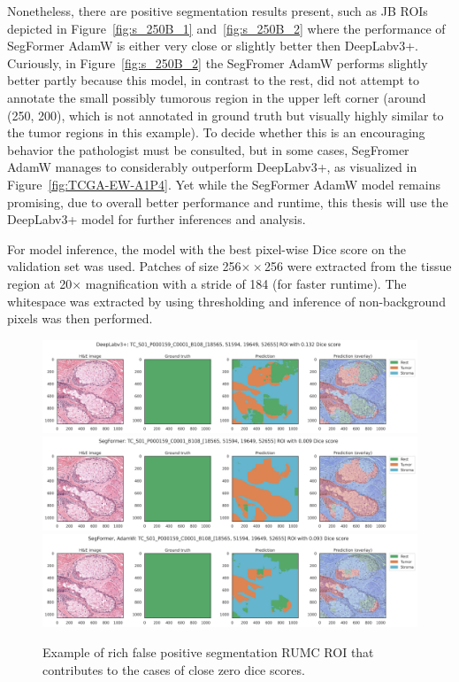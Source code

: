Nonetheless, there are positive segmentation results present, such as JB ROIs depicted in
Figure~\ref*{fig:s_250B_1} and~\ref*{fig:s_250B_2} where the performance of SegFormer AdamW
is either very close or slightly better then DeepLabv3+. 
Curiously, in Figure~\ref*{fig:s_250B_2} the SegFromer AdamW performs slightly better partly
because this model, in contrast to the rest, did not attempt to annotate the small possibly
tumorous region in the upper left corner (around (250, 200), which is not annotated in ground
truth but visually highly similar to the tumor regions in this example). To decide whether
this is an encouraging behavior the pathologist must be consulted, but in some cases,
SegFromer AdamW manages to considerably outperform DeepLabv3+, as visualized in
Figure~\ref*{fig:TCGA-EW-A1P4}. Yet while the SegFormer AdamW model remains promising, due to overall better performance and
runtime, this thesis will use the DeepLabv3+ model for further inferences and analysis.

For model inference, the model with the best pixel-wise Dice score on the validation set was used.
Patches of size 256$×\times$256 were extracted from the tissue region at 20$\times$ magnification
with a stride of 184 (for faster runtime). The whitespace was extracted by using thresholding and
inference of non-background pixels was then performed.

\begin{figure}[H]
    \includegraphics[width=\linewidth]{figures/tissue/deeplabv3+_dice_tc_TC_S01_P000159_C0001_B108_[18565,_51594,_19649,_52655]_check.png}
    \includegraphics[width=\linewidth]{figures/tissue/segformer_dice_tc_TC_S01_P000159_C0001_B108_[18565,_51594,_19649,_52655]_check.png}
    \includegraphics[width=\linewidth]{figures/tissue/segformer,_adamw_dice_tc_TC_S01_P000159_C0001_B108_[18565,_51594,_19649,_52655]_check.png}
    \caption{Example of rich false positive segmentation RUMC ROI that contributes to the cases of close zero dice scores.}
    \label{fig:TC_S01_P000159}
\end{figure}

